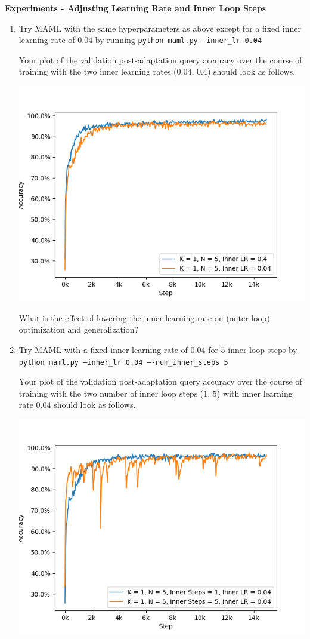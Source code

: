\item {} {\bf Experiments - Adjusting Learning Rate and Inner Loop Steps}

\begin{enumerate}[label=(\roman*)]
    \item Try MAML with the same hyperparameters as above except for a fixed inner learning rate of $0.04$ by running \texttt{python maml.py --inner\_lr 0.04}

    Your plot of the validation post-adaptation query accuracy over the course of training with the two inner learning rates ($0.04$, $0.4$) should look as follows.
    \begin{center}
        \includegraphics[width=0.75\linewidth]{./figures/maml_q3}
    \end{center}
    
    What is the effect of lowering the inner learning rate on (outer-loop) optimization and generalization?

    \item Try MAML with a fixed inner learning rate of $0.04$ for $5$ inner loop steps by \texttt{python maml.py --inner\_lr 0.04 ----num\_inner\_steps 5}

    Your plot of the validation post-adaptation query accuracy over the course of training with the two number of inner loop steps ($1$, $5$) with inner learning rate $0.04$ should look as follows.
    \begin{center}
        \includegraphics[width=0.75\linewidth]{./figures/maml_q4}
    \end{center}


\end{enumerate}
